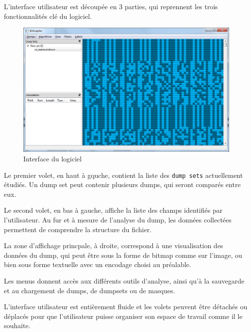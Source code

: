 L'interface utilisateur est découpée en 3 parties, qui reprennent les trois fonctionnalités clé du logiciel.

\begin{figure}[!h]
  \begin{center}
  \includegraphics[width=\textwidth]{res/03-2-interface.png}
  \caption{Interface du logiciel}
  \label{03-2-interface}
  \end{center}
\end{figure}

Le premier volet, en haut à gquche, contient la liste des \texttt{dump sets} actuellement étudiés. Un dump set peut contenir plusieurs dumps, qui seront comparés entre eux.

Le second volet, en bas à gauche, affiche la liste des champs identifiés par l'utilisateur. Au fur et à mesure de l'analyse du dump, les données collectées permettent de comprendre la structure du fichier.

La zone d'affichage princpale, à droite, correspond à une visualisation des données du dump, qui peut être sous la forme de bitmap comme sur l'image, ou bien sous forme textuelle avec un encodage choisi au préalable.

Les menus donnent accès aux différents outils d'analyse, ainsi qu'à la sauvegarde et au chargement de dumps, de dumpsets ou de masques.

L'interface utilisateur est entièrement fluide et les volets peuvent être détachés ou déplacés pour que l'utilisateur puisse organiser son espace de travail comme il le souhaite.
